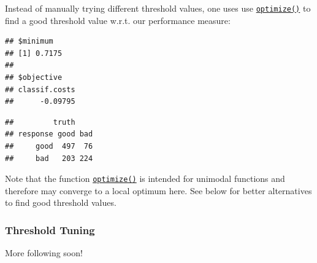 \documentclass[]{article}
\newenvironment{Shaded}{\begin{snugshade}}{\end{snugshade}}
\newcommand{\CommentTok}[1]{\textcolor[rgb]{0.56,0.35,0.01}{\textit{#1}}}
\newcommand{\ControlFlowTok}[1]{\textcolor[rgb]{0.13,0.29,0.53}{\textbf{#1}}}
\newcommand{\DecValTok}[1]{\textcolor[rgb]{0.00,0.00,0.81}{#1}}
\newcommand{\FloatTok}[1]{\textcolor[rgb]{0.00,0.00,0.81}{#1}}
\newcommand{\KeywordTok}[1]{\textcolor[rgb]{0.13,0.29,0.53}{\textbf{#1}}}
\newcommand{\NormalTok}[1]{#1}
\newcommand{\OperatorTok}[1]{\textcolor[rgb]{0.81,0.36,0.00}{\textbf{#1}}}
\newcommand{\StringTok}[1]{\textcolor[rgb]{0.31,0.60,0.02}{#1}}
\renewenvironment{Shaded} {\begin{snugshade}\small} {\end{snugshade}}
\begin{document}
Instead of manually trying different threshold values, one uses use \href{https://www.rdocumentation.org/packages/stats/topics/optimize}{\texttt{optimize()}} to find a good threshold value w.r.t. our performance measure:

\begin{Shaded}
\end{Shaded}

\begin{verbatim}
## $minimum
## [1] 0.7175
## 
## $objective
## classif.costs 
##      -0.09795
\end{verbatim}

\begin{Shaded}
\end{Shaded}

\begin{verbatim}
##         truth
## response good bad
##     good  497  76
##     bad   203 224
\end{verbatim}

Note that the function \href{https://www.rdocumentation.org/packages/stats/topics/optimize}{\texttt{optimize()}} is intended for unimodal functions and therefore may converge to a local optimum here.
See below for better alternatives to find good threshold values.

\hypertarget{threshold-tuning-1}{%
\subsubsection{Threshold Tuning}\label{threshold-tuning-1}}

More following soon!
\end{document}
